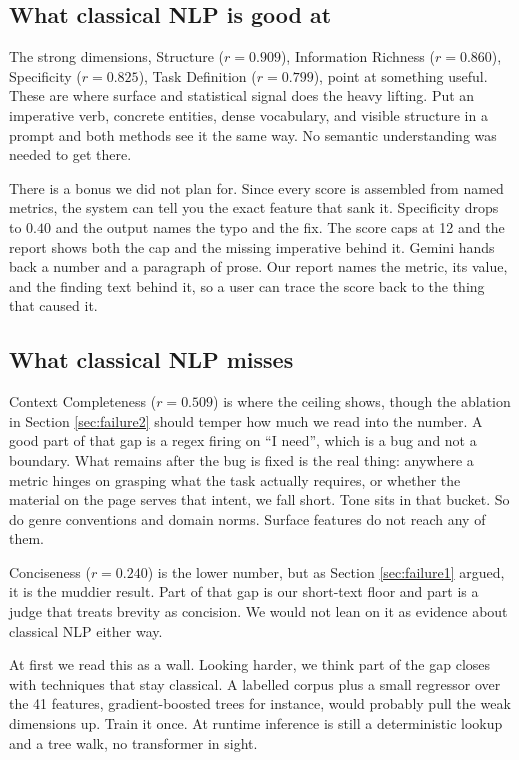 \documentclass[conference]{IEEEtran}
\begin{document}
\subsection{What classical NLP is good at}
The strong dimensions, Structure ($r = 0.909$), Information Richness ($r = 0.860$), Specificity ($r = 0.825$), Task Definition ($r = 0.799$), point at something useful. These are where surface and statistical signal does the heavy lifting. Put an imperative verb, concrete entities, dense vocabulary, and visible structure in a prompt and both methods see it the same way. No semantic understanding was needed to get there.

There is a bonus we did not plan for. Since every score is assembled from named metrics, the system can tell you the exact feature that sank it. Specificity drops to $0.40$ and the output names the typo and the fix. The score caps at 12 and the report shows both the cap and the missing imperative behind it. Gemini hands back a number and a paragraph of prose. Our report names the metric, its value, and the finding text behind it, so a user can trace the score back to the thing that caused it.

\subsection{What classical NLP misses}
Context Completeness ($r = 0.509$) is where the ceiling shows, though the ablation in Section \ref{sec:failure2} should temper how much we read into the number. A good part of that gap is a regex firing on ``I need'', which is a bug and not a boundary. What remains after the bug is fixed is the real thing: anywhere a metric hinges on grasping what the task actually requires, or whether the material on the page serves that intent, we fall short. Tone sits in that bucket. So do genre conventions and domain norms. Surface features do not reach any of them.

Conciseness ($r = 0.240$) is the lower number, but as Section \ref{sec:failure1} argued, it is the muddier result. Part of that gap is our short-text floor and part is a judge that treats brevity as concision. We would not lean on it as evidence about classical NLP either way.

At first we read this as a wall. Looking harder, we think part of the gap closes with techniques that stay classical. A labelled corpus plus a small regressor over the 41 features, gradient-boosted trees for instance, would probably pull the weak dimensions up. Train it once. At runtime inference is still a deterministic lookup and a tree walk, no transformer in sight.
\end{document}
